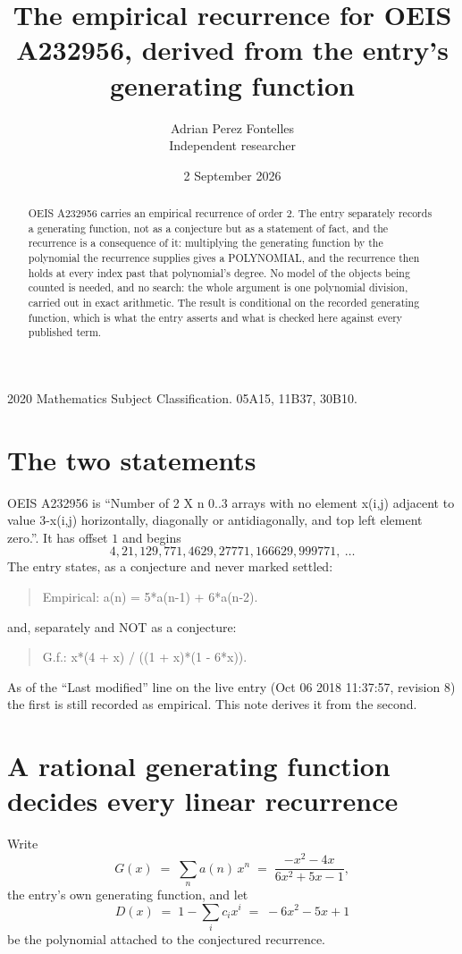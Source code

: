 \documentclass[11pt,a4paper]{article}
\title{The empirical recurrence for OEIS A232956, derived from the entry's generating function}
\author{Adrian Perez Fontelles\\ \small Independent researcher}
\date{2 September 2026}
\theoremstyle{plain}
\theoremstyle{definition}
\begin{document}
\maketitle

\begin{abstract}
OEIS A232956 carries an empirical recurrence of order $2$. The entry separately records a
generating function, not as a conjecture but as a statement of fact, and the recurrence is a
consequence of it: multiplying the generating function by the polynomial the recurrence
supplies gives a POLYNOMIAL, and the recurrence then holds at every index past that
polynomial's degree. No model of the objects being counted is needed, and no search: the
whole argument is one polynomial division, carried out in exact arithmetic. The result is
conditional on the recorded generating function, which is what the entry asserts and what is
checked here against every published term.
\end{abstract}

\noindent\small 2020 Mathematics Subject Classification. 05A15, 11B37, 30B10.\normalsize

\section{The two statements}

OEIS A232956 is ``Number of 2 X n 0..3 arrays with no element x(i,j) adjacent to value 3-x(i,j) horizontally, diagonally or antidiagonally, and top left element zero.''. It has offset $1$ and begins
\[
4, 21, 129, 771, 4629, 27771, 166629, 999771,\ \dots
\]
The entry states, as a conjecture and never marked settled:
\begin{quote}
Empirical: a(n) = 5*a(n-1) + 6*a(n-2).
\end{quote}
and, separately and NOT as a conjecture:
\begin{quote}
G.f.: x*(4 + x) / ((1 + x)*(1 - 6*x)).
\end{quote}
As of the ``Last modified'' line on the live entry (Oct 06 2018 11:37:57, revision 8) the first is still
recorded as empirical. This note derives it from the second.

\section{A rational generating function decides every linear recurrence}

Write
\[
G(x)\;=\;\sum_{n}a(n)\,x^{n}\;=\;\frac{- x^{2} - 4 x}{6 x^{2} + 5 x - 1},
\]
the entry's own generating function, and let
\[
D(x)\;=\;1-\sum_i c_i x^{i}\;=\;- 6 x^{2} - 5 x + 1
\]
be the polynomial attached to the conjectured recurrence.
\end{document}
